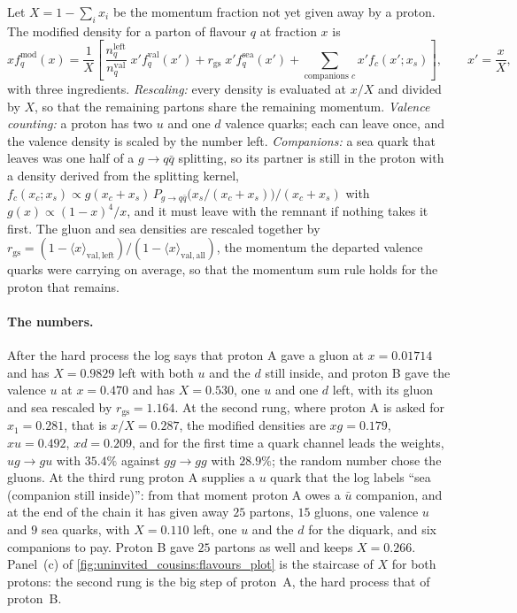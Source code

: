 Let $X=1-\sum_i x_i$ be the momentum fraction not yet given away by a
proton. The modified density for a parton of flavour $q$ at fraction $x$ is
\begin{equation}
  xf_q^{\mathrm{mod}}(x)=\frac{1}{X}\left[\,
    \frac{n_q^{\mathrm{left}}}{n_q^{\mathrm{val}}}\;x'f_q^{\mathrm{val}}(x')
    +r_{\mathrm{gs}}\;x'f_q^{\mathrm{sea}}(x')
    +\sum_{\text{companions }c}x'f_c(x';x_s)\right],
  \qquad x'=\frac{x}{X},
  \label{eq:uninvited_cousins:depleted}
\end{equation}
with three ingredients. \emph{Rescaling:} every density is evaluated at
$x/X$ and divided by $X$, so that the remaining partons share the remaining
momentum. \emph{Valence counting:} a proton has two $u$ and one $d$ valence
quarks; each can leave once, and the valence density is scaled by the
number left. \emph{Companions:} a sea quark that leaves was one half of a
$g\to q\bar q$ splitting, so its partner is still in the proton with a
density derived from the splitting kernel,
$f_c(x_c;x_s)\propto g(x_c+x_s)\,P_{g\to q\bar q}\bigl(x_s/(x_c+x_s)\bigr)/(x_c+x_s)$
with $g(x)\propto(1-x)^4/x$, and it must leave with the remnant if nothing
takes it first. The gluon and sea densities are rescaled together by
$r_{\mathrm{gs}}=(1-\langle x\rangle_{\mathrm{val,left}})/(1-\langle x\rangle_{\mathrm{val,all}})$,
the momentum the departed valence quarks were carrying on average, so
that the momentum sum rule holds for the proton that remains.

\paragraph{The numbers.} After the hard process the log says that proton A
gave a gluon at $x=0.01714$ and has $X=0.9829$ left with both $u$ and the
$d$ still inside, and proton B gave the valence $u$ at $x=0.470$ and has
$X=0.530$, one $u$ and one $d$ left, with its gluon and sea rescaled by
$r_{\mathrm{gs}}=1.164$. At the second rung, where proton A is asked for
$x_1=0.281$, that is $x/X=0.287$, the modified densities are $xg=0.179$,
$xu=0.492$, $xd=0.209$, and for the first time a quark channel leads the
weights, $ug\to gu$ with $35.4\%$ against $gg\to gg$ with $28.9\%$; the
random number chose the gluons. At the third rung proton A supplies a $u$
quark that the log labels ``sea (companion still inside)'': from that
moment proton A owes a $\bar u$ companion, and at the end of the chain it
has given away $25$ partons, $15$ gluons, one valence $u$ and $9$ sea
quarks, with $X=0.110$ left, one $u$ and the $d$ for the diquark, and six
companions to pay. Proton B gave $25$ partons as well and keeps
$X=0.266$. Panel~(c) of \cref{fig:uninvited_cousins:flavours_plot} is the
staircase of $X$ for both protons: the second rung is the big step of
proton~A, the hard process that of proton~B.

